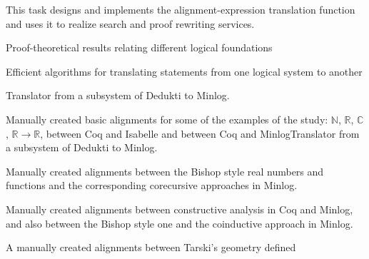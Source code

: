 \begin{workpackage}
\begin{tasklist}
  \begin{task}[id=alignservices,title=Alignment-Based Services,lead=Fau,FauRM=18,BolRM=14,InrRM=7]
This task designs and implements the alignment-expression translation function and uses it to realize search and proof rewriting services.
  \end{task}
\end{tasklist}

\begin{wpdelivs}
  \begin{wpdeliv}[due=3,miles=startup,id=prooftheoretical,dissem=PU,nature=DEM,lead=Lee]
    {Proof-theoretical results relating different logical foundations}
  \end{wpdeliv}
  \begin{wpdeliv}[due=3,miles=startup,id=translatingstatements,dissem=PU,nature=DEM,lead=Lee]
    {Efficient algorithms for translating statements from one logical system to another}
  \end{wpdeliv}
  \begin{wpdeliv}[due=3,miles=startup,id=deduktitominilog,dissem=PU,nature=DEM,lead=Lmu]
    {Translator from a subsystem of Dedukti to Minlog. }
  \end{wpdeliv}
  \begin{wpdeliv}[due=3,miles=startup,id=aligningnumbers,dissem=PU,nature=DEM,lead=Str]
    {Manually created basic alignments for some of the examples of the
      study: $\mathbb{N}$, $\mathbb{R}$, $\mathbb{C}$, $\mathbb{R}
      \rightarrow \mathbb{R}$, between Coq and Isabelle and between
      Coq and MinlogTranslator from a subsystem of Dedukti to
      Minlog.}
  \end{wpdeliv}
  \begin{wpdeliv}[due=3,miles=startup,id=aligningnumbersminilog,dissem=PU,nature=DEM,lead=Lmu]
    {Manually created alignments between the Bishop style real numbers
      and functions and the corresponding corecursive approaches in
      Minlog.}
  \end{wpdeliv}
  \begin{wpdeliv}[due=3,miles=startup,id=aligningconstructiveanalysisminilog,dissem=PU,nature=DEM,lead=Lmu]
    {Manually created alignments between constructive analysis in Coq
      and Minlog, and also between the Bishop style one and the
      coinductive approach in Minlog.}
  \end{wpdeliv}
  \begin{wpdeliv}[due=3,miles=startup,id=aligninggeometries,dissem=PU,nature=DEM,lead=Bel]
    {A manually created alignments between Tarski's geometry defined
}
\end{wpdeliv}
\end{wpdelivs}
\end{workpackage}
